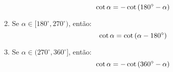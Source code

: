 \begin{frame}
\begin{columns}[onlytextwidth]
\begin{column}{0.49\textwidth}
\begin{highlight}
\begin{enumerate}
          \begin{equation*}
            \cot{\alpha}=-\cot{(180^{\circ}-\alpha)}\vspace*{-0.2cm}
          \end{equation*}
          \item Se $\alpha\in[180^{\circ},270^{\circ})$, então:\vspace*{-0.2cm}
          \begin{equation*}
            \cot{\alpha}=\cot{(\alpha-180^{\circ})}\vspace*{-0.2cm}
          \end{equation*}
          \item Se $\alpha\in(270^{\circ},360^{\circ}]$, então:\vspace*{-0.2cm}
          \begin{equation*}
            \cot{\alpha}=-\cot{(360^{\circ}-\alpha)}\vspace*{-0.2cm}
          \end{equation*}
        \end{enumerate}
      \end{highlight}
    \end{column}
  \end{columns}
\end{frame}


